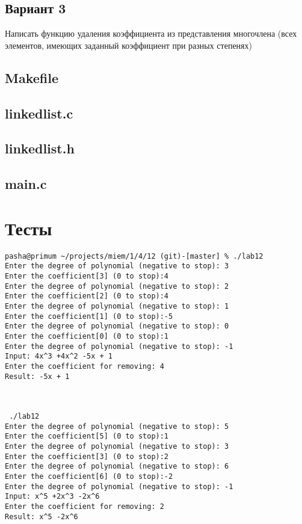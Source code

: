\documentclass[a4paper,12pt,fleqn,twoside]{scrartcl}
\begin{document}
\subsection*{Вариант 3}
Написать функцию удаления коэффициента из представления многочлена (всех элементов, имеющих заданный коэффициент при разных степенях)

\subsection*{Makefile}


\subsection*{linkedlist.c}


\subsection*{linkedlist.h}

\subsection{main.c}

\section*{Тесты}
\small
\begin{verbatim}
pasha@primum ~/projects/miem/1/4/12 (git)-[master] % ./lab12
Enter the degree of polynomial (negative to stop): 3
Enter the coefficient[3] (0 to stop):4
Enter the degree of polynomial (negative to stop): 2
Enter the coefficient[2] (0 to stop):4
Enter the degree of polynomial (negative to stop): 1
Enter the coefficient[1] (0 to stop):-5
Enter the degree of polynomial (negative to stop): 0
Enter the coefficient[0] (0 to stop):1
Enter the degree of polynomial (negative to stop): -1
Input: 4x^3 +4x^2 -5x + 1
Enter the coefficient for removing: 4
Result: -5x + 1



 ./lab12
Enter the degree of polynomial (negative to stop): 5
Enter the coefficient[5] (0 to stop):1
Enter the degree of polynomial (negative to stop): 3
Enter the coefficient[3] (0 to stop):2
Enter the degree of polynomial (negative to stop): 6
Enter the coefficient[6] (0 to stop):-2
Enter the degree of polynomial (negative to stop): -1
Input: x^5 +2x^3 -2x^6
Enter the coefficient for removing: 2
Result: x^5 -2x^6

\end{verbatim}

\end{document}
